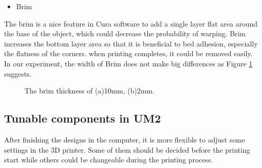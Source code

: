 \begin{itemize}
\item Brim
\end{itemize}
The brim is a nice feature in Cura software to add a single layer flat area around the base of the object, which could decrease the probability of warping. Brim increases the bottom layer area so that it is beneficial to bed adhesion, especially the flatness of the corners.  when printing completes, it could be removed easily. In our experiment, the width of Brim does not make big differences as Figure \ref{Fig:Brim} suggests.
\begin{figure}[htbp] %
	\centering

  \caption[The brim thickness]{\footnotesize The brim thickness of (a)10mm, (b)2mm. }
  \label{Fig:Brim}
\end{figure}

\subsection{Tunable components in UM2}
After finishing the designs in the computer, it is more flexible to adjust some settings in the 3D printer. Some of them should be decided before the printing start while others could be changeable during the printing process\cite{stick}.

